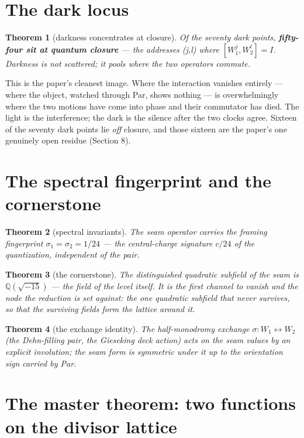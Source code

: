 \documentclass[11pt]{article}
\theoremstyle{plain}
\newtheorem{theorem}{Theorem}[section]
\theoremstyle{definition}
\theoremstyle{remark}
\begin{document}
\section{The dark locus}

\begin{theorem}[darkness concentrates at closure]
Of the seventy dark points, \textbf{fifty-four sit at quantum closure} — the addresses (j,l) where \([W_{1}^{j}, W_{2}^{l}] = I\). Darkness is not scattered; it pools where the two operators commute.
\end{theorem}

This is the paper's cleanest image. Where the interaction vanishes entirely — where the object, watched through Par, shows nothing — is overwhelmingly where the two motions have come into phase and their commutator has died. The light is the interference; the dark is the silence after the two clocks agree. Sixteen of the seventy dark points lie \emph{off} closure, and those sixteen are the paper's one genuinely open residue (Section 8).

\section{The spectral fingerprint and the cornerstone}

\begin{theorem}[spectral invariants]
The seam operator carries the framing fingerprint \(\sigma _{1} = \sigma _{2} = 1/24\) — the central-charge signature \(c/24\) of the quantization, independent of the pair.
\end{theorem}

\begin{theorem}[the cornerstone]
The distinguished quadratic subfield of the seam is \(\mathbb{Q}(\sqrt{-15})\) — the field of the level itself. It is the first channel to vanish and the node the reduction is set against: the one quadratic subfield that never survives, so that the surviving fields form the lattice \emph{around} it.
\end{theorem}

\begin{theorem}[the exchange identity]
The half-monodromy exchange \(\sigma : W_{1} \leftrightarrow  W_{2}\) (the Dehn-filling pair, the Gieseking deck action) acts on the seam values by an explicit involution; the seam form is symmetric under it up to the orientation sign carried by Par.
\end{theorem}

\section{The master theorem: two functions on the divisor lattice}
\end{document}
